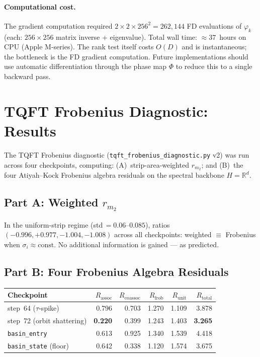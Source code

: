 \documentclass[11pt]{amsart}
\begin{document}
\paragraph{Computational cost.}
The gradient computation required $2\times2\times256^2 = 262{,}144$
FD evaluations of $\varphi_k$ (each: $256\times256$ matrix inverse + eigenvalue).
Total wall time: $\approx 37$~hours on CPU (Apple M-series).
The rank test itself costs $O(D)$ and is instantaneous;
the bottleneck is the FD gradient computation.
Future implementations should use automatic differentiation
through the phase map $\Phi$ to reduce this to a single backward pass.


\section{TQFT Frobenius Diagnostic: Results}
\label{sec:tqft_results}

The TQFT Frobenius diagnostic (\texttt{tqft\_frobenius\_diagnostic.py} v2)
was run across four checkpoints, computing:
(A)~strip-area-weighted $r_{m_2}$; and
(B)~the four Atiyah--Kock Frobenius algebra residuals
on the spectral backbone $H = \mathbb{R}^d$.

\subsection{Part A: Weighted $r_{m_2}$}

In the uniform-strip regime (std\,$= 0.06$--$0.085$),
ratios $(-0.996, +0.977, -1.004, -1.008)$ across all checkpoints:
weighted $\equiv$ Frobenius when $\sigma_i \approx \mathrm{const}$.
No additional information is gained --- as predicted.

\subsection{Part B: Four Frobenius Algebra Residuals}

\begin{center}
\small
\begin{tabular}{@{}lrrrrr@{}}
\toprule
Checkpoint & $R_\mathrm{assoc}$ & $R_\mathrm{coassoc}$
           & $R_\mathrm{frob}$ & $R_\mathrm{unit}$ & $R_\mathrm{total}$ \\
\midrule
step~64 ($\tau$-spike)        & 0.796 & 0.703 & 1.270 & 1.109 & 3.878 \\
step~72 (orbit shattering)     & \textbf{0.220} & 0.399 & 1.243 & 1.403 & \textbf{3.265} \\
\texttt{basin\_entry}        & 0.613 & 0.925 & 1.340 & 1.539 & 4.418 \\
\texttt{basin\_state} (floor) & 0.642 & 0.338 & 1.120 & 1.574 & 3.675 \\
\bottomrule
\end{tabular}
\end{center}
\end{document}
